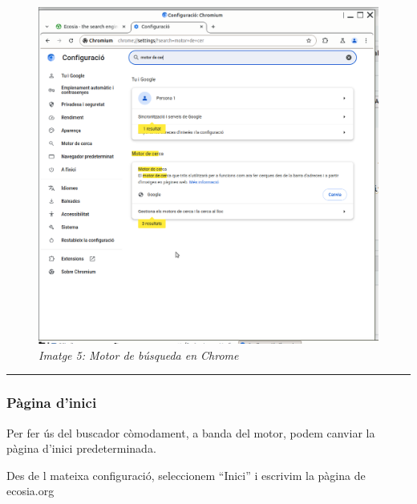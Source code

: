 \documentclass[
  a4paper,
]{article}
\begin{document}
\begin{figure}
\centering
\includegraphics{png/2-Chrome-Motor.png}
\caption{\emph{Imatge 5: Motor de búsqueda en Chrome}}
\end{figure}

\begin{center}\rule{0.5\linewidth}{0.5pt}\end{center}

\subsubsection{Pàgina d'inici}\label{puxe0gina-dinici-1}

Per fer ús del buscador còmodament, a banda del motor, podem canviar la
pàgina d'inici predeterminada.

Des de l mateixa configuració, seleccionem ``Inici'' i escrivim la
pàgina de ecosia.org
\end{document}
